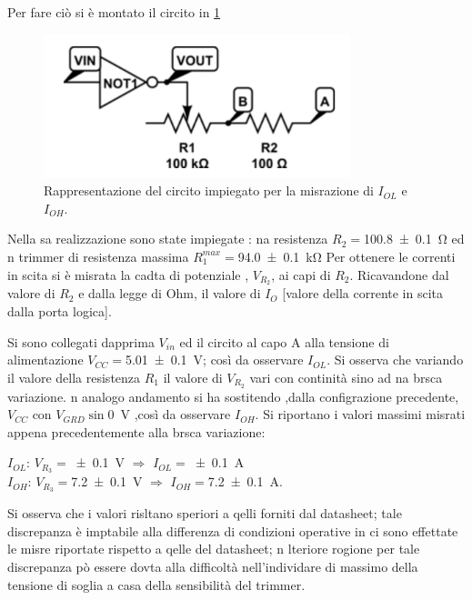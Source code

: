 	Per fare ciò si è montato  il circito in \figurename{ \ref{f:c2} }
	\begin{center}
		\begin{figure}[h]
			\includegraphics[scale=0.75]{../immagine/cir2.png}
			\caption{Rappresentazione del circito impiegato per la misrazione di $I_{OL}$ e $I_{OH}$. }
			\label{f:c2}
		\end{figure}
	\end{center}
	Nella sa realizzazione sono state impiegate : na resistenza $R_{2}=$\SI{100.8 \pm 0.1}{\ohm} ed n trimmer di resistenza massima $R_{1}^{max}=$\SI{94.0 \pm 0.1 }{ \kilo \ohm}
	Per ottenere le correnti in scita  si è misrata la cadta di potenziale , $V_{R_{2}}$, ai capi di $R_{2}$.
	Ricavandone dal valore di $R_{2}$ e dalla legge di Ohm, il valore di $I_{O}$ [valore della corrente in scita dalla porta logica].
	
	Si sono collegati dapprima $V_{in}$ ed il circito al capo A alla tensione di alimentazione $V_{CC}=$\SI{5.01 \pm 0.1}{\volt}; così da osservare $I_{OL}$.
	Si osserva che variando il valore della resistenza $R_{1}$ il
	valore di  $V_{R_{2}}$  vari con continità sino ad na brsca variazione.
	n analogo andamento si ha sostitendo ,dalla configrazione precedente, $V_{CC}$
	con  $V_{GRD}\sin$\SI{0}{\volt} ,così da osservare $I_{OH}$.
	Si riportano i valori massimi misrati appena precedentemente  alla brsca variazione:\\
	\begin{center}
	
	\bigskip
	$I_{OL}$: $V_{R_{3}}=$\SI{ \pm 0.1}{\volt} 
	$\Rightarrow$ $I_{OL}=$\SI{ \pm 0.1}{\ampere}\\

	$I_{OH}$: $V_{R_{3}}=$\SI{7.2 \pm 0.1}{\volt} 
	$\Rightarrow$ $I_{OH}=$\SI{7.2 \pm 0.1}{\ampere}.\\
	\end{center}
	Si osserva che i valori risltano speriori a qelli forniti dal datasheet;
	tale discrepanza è imptabile alla differenza di condizioni operative in ci sono effettate le misre riportate rispetto a qelle del datasheet;
	n lteriore rogione per tale discrepanza pò essere dovta alla difficoltà nell'individare di massimo della tensione di soglia a casa della sensibilità del trimmer. 
	
